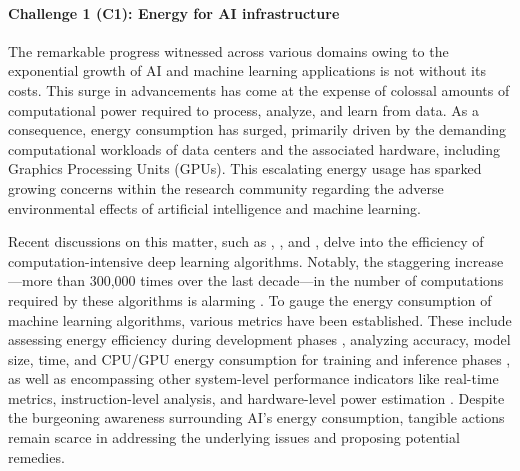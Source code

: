 \documentclass[12pt]{article}
\begin{document}
\paragraph*{\textbf{Challenge 1} (C1): Energy for AI infrastructure}
The remarkable progress witnessed across various domains owing to the exponential growth of AI and machine learning applications is not without its costs. This surge in advancements has come at the expense of colossal amounts of computational power required to process, analyze, and learn from data. As a consequence, energy consumption has surged, primarily driven by the demanding computational workloads of data centers and the associated hardware, including Graphics Processing Units (GPUs). This escalating energy usage has sparked growing concerns within the research community regarding the adverse environmental effects of artificial intelligence and machine learning.

Recent discussions on this matter, such as \cite{schwartz2019green}, \cite{vinuesa2020role}, and \cite{Strubell2019EnergyPolicyConsiderations}, delve into the efficiency of computation-intensive deep learning algorithms. Notably, the staggering increase---more than 300,000 times over the last decade---in the number of computations required by these algorithms is alarming \cite{schwartz2019green}. To gauge the energy consumption of machine learning algorithms, various metrics have been established. These include assessing energy efficiency during development phases \cite{zhou2020hulk}, analyzing accuracy, model size, time, and CPU/GPU energy consumption for training and inference phases \cite{Dalgren2019GreenMLA}, as well as encompassing other system-level performance indicators like real-time metrics, instruction-level analysis, and hardware-level power estimation \cite{garcia2019estimation}. Despite the burgeoning awareness surrounding AI's energy consumption, tangible actions remain scarce in addressing the underlying issues and proposing potential remedies.
\end{document}
